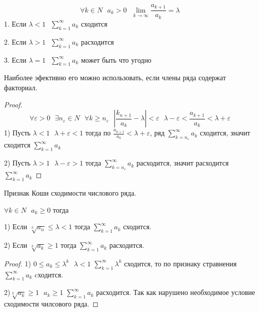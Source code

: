 \begin{theorem}
  $$
  \forall k \in N ~~~ a_k > 0 ~~~
  \lim_{k \to \infty} \frac{a_{k+1}}{a_k} = \lambda
  $$
  1. Если $\lambda < 1 ~~~ \sum_{k=1}^{\infty} a_k$ сходится

  2. Если $\lambda > 1 ~~~ \sum_{k=1}^{\infty} a_k$ расходится

  3. Если $\lambda = 1 ~~~ \sum_{k=1}^{\infty} a_k$ может быть что угодно

  Наиболее эфективно его можно использовать, если члены ряда содержат факториал.
\end{theorem}

\begin{proof}
  $$
  \forall \varepsilon > 0 ~~~
  \exists n_{\varepsilon} \in N ~~~
  \forall k \ge n_{\varepsilon} ~~~
  \left| \frac{k_{n+1}}{a_k} - \lambda \right| < \varepsilon ~~~
  \lambda - \varepsilon < \frac{a_{k+1}}{a_k} < \lambda + \varepsilon
  $$
  1) Пусть $\lambda < 1 ~~~ \lambda + \varepsilon < 1$ тогда по
  $\frac{a_{k+1}}{a_k} < \lambda + \varepsilon$, ряд
  $\sum_{k = n_{\varepsilon}}^{\infty} a_k$ сходится, значит сходится
  $\sum_{k = 1}^{\infty} a_k$

  2) Пусть $\lambda > 1 ~~~ \lambda - \varepsilon > 1$ тогда
  $\sum_{k = n_{\varepsilon}}^{\infty} a_k$ расходится, значит расходится
  $\sum_{k = 1}^{\infty} a_k$
\end{proof}

\begin{title}[\Large]
  Признак Коши сходимости числового ряда.
\end{title}

\begin{block}
  $\forall k \in N ~~~ a_k \ge 0$ тогда

  1) Если $\sqrt[k]{a_n} \le \lambda < 1$ тогда
  $\sum_{k=1}^{\infty} a_k$ сходится.

  2) Если $\sqrt[k]{a_k} \ge 1$ тогда $\sum_{k=1}^{\infty} a_k$ расходится.
\end{block}

\begin{proof}
  1) $0 \le a_k \le \lambda^k ~~~ \lambda < 1$ $\sum_{k=1}^{\infty} \lambda^k$
  сходится, то по признаку стравнения $\sum_{k=1}^{\infty} a_k$ cходится.

  2)$\sqrt[k]{a_k} \ge 1 ~~~ a_k \ge 1$ $\sum_{k=1}^{\infty} a_k$ расходится.
  Так как нарушено необходимое условие сходимости чилсового ряда.
\end{proof}

